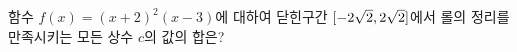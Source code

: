 함수 $f(x)=(x+2)^2(x-3)$에 대하여 닫힌구간 $[-2\sqrt{2}{,}\mkern3mu\mathopen{}2\sqrt{2}]$에서 롤의 정리를 만족시키는 모든 상수 $c$의 값의 합은?
